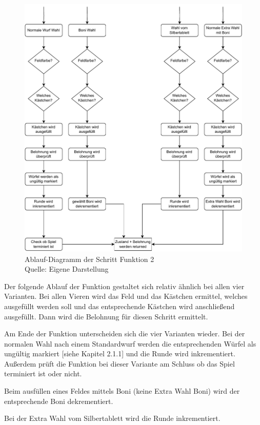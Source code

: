 \begin{figure}[H]
	\includegraphics[width=1\textwidth]{Bilder/step2.drawio} 
	\caption[Ablauf-Diagramm der Schritt Funktion 2]{Ablauf-Diagramm der Schritt Funktion 2\\ Quelle: Eigene Darstellung}
\end{figure}

Der folgende Ablauf der Funktion gestaltet sich relativ ähnlich bei allen vier Varianten. Bei allen Vieren wird das Feld und das Kästchen ermittel, welches ausgefüllt werden soll und das entsprechende Kästchen wird anschließend ausgefüllt. Dann wird die Belohnung für diesen Schritt ermittelt.

Am Ende der Funktion unterscheiden sich die vier Varianten wieder. Bei der normalen Wahl nach einem Standardwurf werden die entsprechenden Würfel als ungültig markiert [siehe Kapitel 2.1.1] und die Runde wird inkrementiert. Außerdem prüft die Funktion bei dieser Variante am Schluss ob das Spiel terminiert ist oder nicht.

Beim ausfüllen eines Feldes mittels Boni (keine Extra Wahl Boni) wird der entsprechende Boni dekrementiert.

Bei der Extra Wahl vom Silbertablett wird die Runde inkrementiert.

